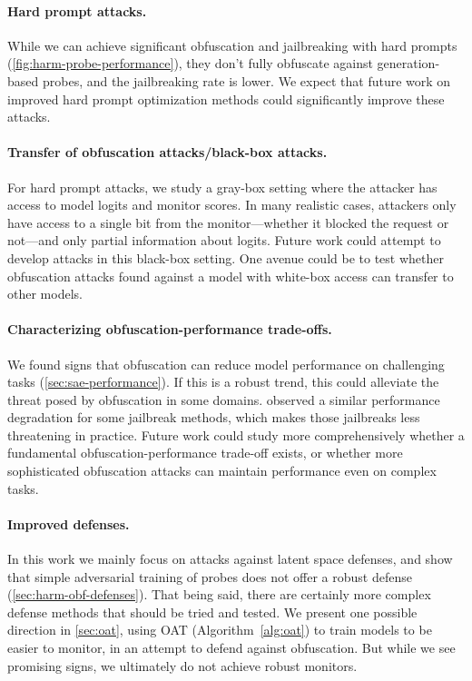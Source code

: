 \documentclass{article}
\begin{document}
\paragraph{Hard prompt attacks.}
While we can achieve significant obfuscation and jailbreaking with
hard prompts (\cref{fig:harm-probe-performance}), they don't fully
obfuscate against generation-based probes, and the jailbreaking
rate is lower. We expect that future work on improved hard prompt
optimization methods could significantly improve these attacks.

\paragraph{Transfer of obfuscation attacks/black-box attacks.}
For hard prompt attacks, we study a gray-box setting where the attacker has
access to model logits and monitor scores. In many realistic cases,
attackers only have access to a single bit from the monitor---whether it
blocked the request or not---and only partial information about logits.
Future work could attempt to develop attacks in this black-box setting.
One avenue could be to test whether obfuscation attacks found
against a model with white-box access can transfer to other models.

\paragraph{Characterizing obfuscation-performance trade-offs.}
We found signs that obfuscation can reduce model performance
on challenging tasks (\cref{sec:sae-performance}). If this is
a robust trend, this could alleviate the threat posed
by obfuscation in some domains.  observed a
similar performance degradation for some jailbreak methods, which makes
those jailbreaks less threatening in practice. Future work could
study more comprehensively whether a fundamental obfuscation-performance
trade-off exists, or whether more sophisticated obfuscation attacks
can maintain performance even on complex tasks.

\paragraph{Improved defenses.} In this work we mainly focus
on attacks against latent space defenses, and show that 
simple adversarial training of probes does not offer 
a robust defense (\cref{sec:harm-obf-defenses}). 
That being said, there are certainly more complex 
defense methods that should be tried and tested.
We present one possible direction in  
\cref{sec:oat}, using OAT (Algorithm~\ref{alg:oat}) to 
train models to be easier to monitor, in an attempt to defend against obfuscation. But while we see promising signs, we ultimately do not achieve robust monitors.
\end{document}
